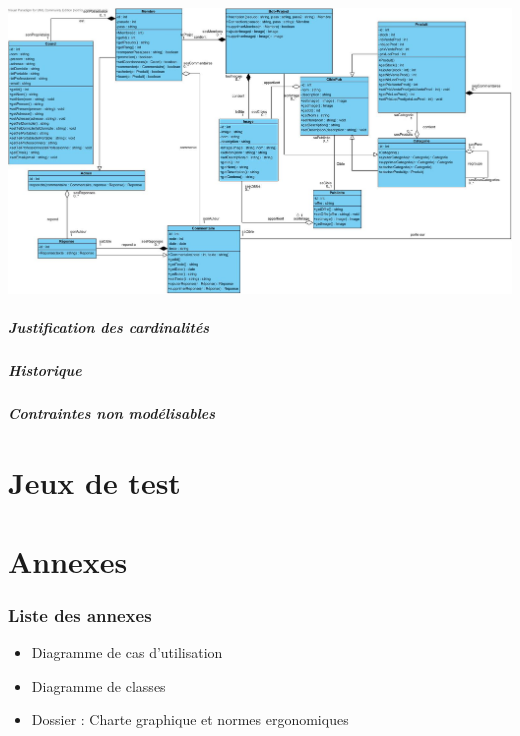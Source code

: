 \documentclass[10pt,a4paper]{article}
\begin{document}
					\includegraphics[scale=0.2]{donnees/classes.jpg}
				\subsubsection{Justification des cardinalités}
					
				\subsubsection{Historique}
					
				\subsubsection{Contraintes non modélisables}
					
	\newpage
	\part{Jeux de test}
	\newpage
	\part{Annexes}
		\section{Liste des annexes}
		\begin{itemize}
			\item Diagramme de cas d'utilisation
			\item Diagramme de classes
			\item Dossier : Charte graphique et normes ergonomiques
		\end{itemize}
\end{document}
